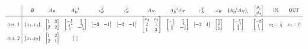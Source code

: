 \begin{equation*}
\scalemath{0.65}{
\begin{array}{ c|c c c c c c c c c c c c c }
 & B & A_{B} & A_{B}^{-1} & c_{B}^{T} & c_{N}^{T} & A_{N} & A_{B}^{-1} A_{N} & r_{N}^{T} & x_{B} & \left( A_{B}^{-1} A_{N}\right)_{i} & \begin{bmatrix}
\vartheta _{1}\\
\vartheta _{2}
\end{bmatrix} & \text{IN} & \text{OUT}\\
\hline
\text{iter.} \ 1 & \{x_{1} ,x_{4}\} & \begin{bmatrix}
1 & 3\\
2 & 2
\end{bmatrix} & \begin{bmatrix}
-\frac{1}{2} & \frac{3}{4}\\
\frac{1}{2} & -\frac{1}{4}
\end{bmatrix} & \begin{bmatrix}
-3 & -1
\end{bmatrix} & \begin{bmatrix}
-2 & -1
\end{bmatrix} & \begin{bmatrix}
x_{2} & x_{3}\\
2 & 1\\
1 & 3
\end{bmatrix} & \begin{bmatrix}
-\frac{1}{4} & \frac{7}{4}\\
\frac{3}{4} & -\frac{1}{4}
\end{bmatrix} & \begin{bmatrix}
-2 & 4
\end{bmatrix} & \begin{bmatrix}
\frac{5}{4}\\
\frac{1}{4}
\end{bmatrix} & \begin{bmatrix}
-\frac{1}{4}\\
\frac{3}{4}
\end{bmatrix} & \begin{bmatrix}
-5\\
\frac{1}{3}
\end{bmatrix} & x_{2} =\frac{1}{3} & x_{4} =0\\
\text{iter.} \ 2 & \{x_{1} ,x_{2}\} & \begin{bmatrix}
1 & 2\\
2 & 1
\end{bmatrix} & \begin{bmatrix}

\end{bmatrix}
\end{array}}
\end{equation*}
